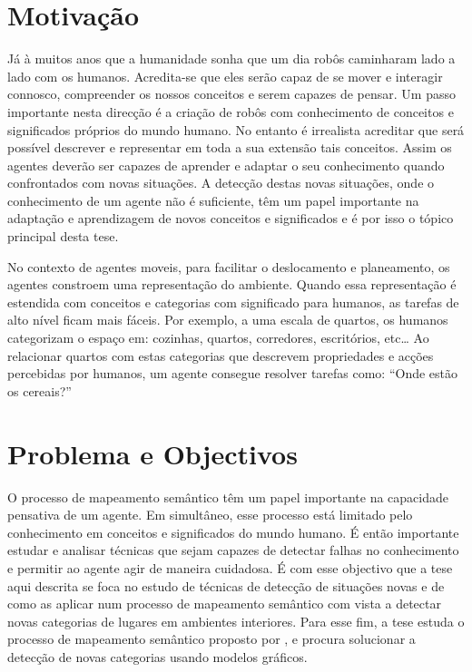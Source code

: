 \documentclass[9pt,a4paper]{extarticle}
\begin{document}
\begin{multicols}{2}

\section{Motivação}
Já à muitos anos que a humanidade sonha que um dia robôs caminharam lado a lado com os humanos.
Acredita-se que eles serão capaz de se mover e interagir connosco, compreender os nossos conceitos
e serem capazes de pensar.
Um passo importante nesta direcção é a criação de robôs com conhecimento de conceitos e significados
próprios do mundo humano.
No entanto é irrealista acreditar que será possível descrever e representar em toda a sua extensão
tais conceitos. Assim os agentes deverão ser capazes de aprender e adaptar o seu conhecimento quando
confrontados com novas situações.
A detecção destas novas situações, onde o conhecimento de um agente não é suficiente, têm um papel importante
na adaptação e aprendizagem de novos conceitos e significados e é por isso o tópico principal desta tese.

No contexto de agentes moveis, para facilitar o deslocamento e planeamento, os
agentes constroem uma representação do ambiente. Quando essa representação é estendida com
conceitos e categorias com significado para humanos, as tarefas de alto nível ficam mais fáceis.
Por exemplo, a uma escala de quartos, os humanos categorizam o espaço em: cozinhas, quartos, corredores,
escritórios, etc\dots
Ao relacionar quartos com estas categorias que descrevem propriedades e acções percebidas por
humanos, um agente consegue resolver tarefas como: ``Onde estão os cereais?''

\section{Problema e Objectivos}
O processo de mapeamento semântico têm um papel importante na capacidade pensativa de um agente.
Em simultâneo, esse processo está limitado pelo conhecimento em conceitos e significados do mundo humano.
É então importante estudar e analisar técnicas que sejam capazes de detectar falhas no conhecimento e permitir ao agente agir de maneira
cuidadosa.
É com esse objectivo que a tese aqui descrita se foca no estudo de técnicas de detecção de situações novas
e de como as aplicar num processo de mapeamento semântico com vista a detectar novas categorias de lugares
em ambientes interiores. Para esse fim, a tese estuda o processo de mapeamento semântico proposto por \cite{pronobis2011phd},
e procura solucionar a detecção de novas categorias usando modelos gráficos.


\end{multicols}
\end{document}
